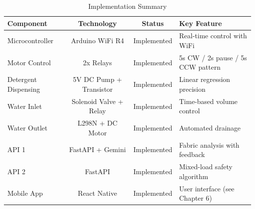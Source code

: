 \begin{table}[H]
    \centering
    \begin{tabular}{|l|c|c|p{5cm}|}
        \hline
        \textbf{Component} & \textbf{Technology} & \textbf{Status} & \textbf{Key Feature} \\
        \hline
        Microcontroller & Arduino WiFi R4 & Implemented & Real-time control with WiFi \\
        Motor Control & 2x Relays & Implemented & 5s CW / 2s pause / 5s CCW pattern \\
        Detergent Dispensing & 5V DC Pump + Transistor & Implemented & Linear regression precision \\
        Water Inlet & Solenoid Valve + Relay & Implemented & Time-based volume control \\
        Water Outlet & L298N + DC Motor & Implemented & Automated drainage \\
        API 1 & FastAPI + Gemini & Implemented & Fabric analysis with feedback \\
        API 2 & FastAPI & Implemented & Mixed-load safety algorithm \\
        Mobile App & React Native & Implemented & User interface (see Chapter 6) \\
        \hline
    \end{tabular}
    \caption{Implementation Summary}
    \label{tab:impl_summary}
\end{table}